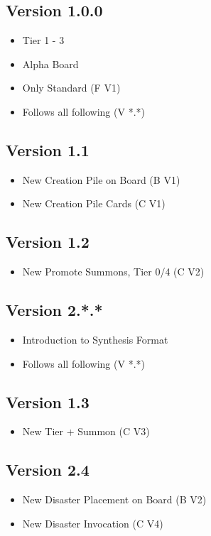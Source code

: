 \documentclass[12pt, letterpaper]{article}
\begin{document}
\subsection{Version 1.0.0}
\begin{itemize}
    \item Tier 1 - 3
    \item Alpha Board
    \item Only Standard (F V1)
    \item Follows all following (V *.*)
\end{itemize}
%
\subsection{Version 1.1}
\begin{itemize}
    \item New Creation Pile on Board (B V1)
    \item New Creation Pile Cards (C V1)
\end{itemize}
%
\subsection{Version 1.2}
\begin{itemize}
    \item New Promote Summons, Tier 0/4 (C V2)
\end{itemize}
%
\subsection{Version 2.*.*}
\begin{itemize}
    \item Introduction to Synthesis Format 
    \item Follows all following (V *.*)
\end{itemize}
%
\subsection{Version 1.3}
\begin{itemize}
    \item New Tier + Summon (C V3)
\end{itemize}
%
\subsection{Version 2.4}
\begin{itemize}
    \item New Disaster Placement on Board (B V2)
    \item New Disaster Invocation (C V4)
\end{itemize}
%
\end{document}
